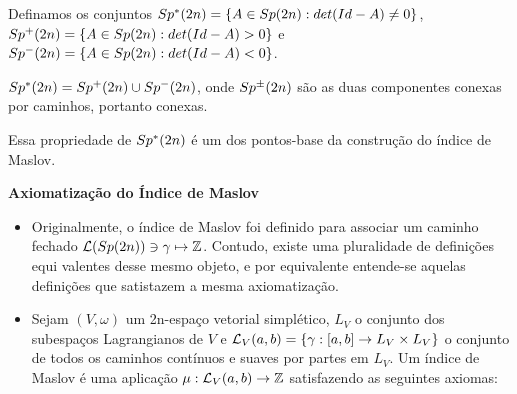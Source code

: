 \documentclass{beamer}
\newcommand{\titulo}[1]{\centering \textbf{#1}}
\begin{document}
\begin{frame}
	Definamos os conjuntos $Sp^{*}(2n) = \{ A \in Sp(2n): det(Id-A)\neq 0 \}$, $Sp^{+}(2n) = \{ A \in Sp(2n): det(Id-A)> 0 \}$ e  $Sp^{-}(2n) = \{ A \in Sp(2n): det(Id-A)< 0 \}$.

	\begin{lema}
		$Sp^{*}(2n) = Sp^{+}(2n)\cup Sp^{-}(2n)$, onde $Sp^{\pm}(2n)$ são as duas componentes conexas por caminhos, portanto conexas.
	\end{lema}
	
	Essa propriedade de $Sp^{*}(2n)$ é um dos pontos-base da construção do índice de Maslov.
\end{frame}

\begin{frame}
	\titulo{Axiomatização do Índice de Maslov}
	
	\begin{itemize}
		\item 
		Originalmente, o índice de Maslov foi definido para associar um caminho fechado $\mathcal{L}(Sp(2n)) \ni \gamma \mapsto \mathbb{Z}$. Contudo, existe uma pluralidade de definições equi
		valentes desse mesmo objeto, e por equivalente entende-se aquelas definições que satistazem a mesma axiomatização. 
		
		\item 
		Sejam $(V, \omega)$ um 2n-espaço vetorial simplético, $L_{V}$ o conjunto dos subespaços Lagrangianos de $V$ e   $\mathcal{L}_{V}(a,b)= \{\gamma:[a,b]\to L_{V}\times L_{V}\}$ o conjunto de todos os caminhos contínuos e suaves por partes em $L_{V}$. Um índice de Maslov é uma aplicação $\mu:\mathcal{L}_{V}(a,b)\to \mathbb{Z}$ satisfazendo as seguintes axiomas:
	\end{itemize}
	
\end{frame}
\end{document}
